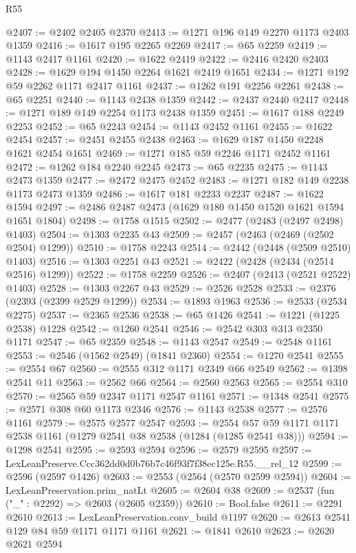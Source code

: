 \begin{lexlean}{R55}
\begin{coremodule}
@2407 := @2402 @2405 @2370
@2413 := @1271 @196 @149 @2270 @1173 @2403 @1359
@2416 := @1617 @195 @2265 @2269
@2417 := @65 @2259
@2419 := @1143 @2417 @1161
@2420 := @1622 @2419
@2422 := @2416 @2420 @2403
@2428 := @1629 @194 @1450 @2264 @1621 @2419 @1651
@2434 := @1271 @192 @59 @2262 @1171 @2417 @1161
@2437 := @1262 @191 @2256 @2261
@2438 := @65 @2251
@2440 := @1143 @2438 @1359
@2442 := @2437 @2440 @2417
@2448 := @1271 @189 @149 @2254 @1173 @2438 @1359
@2451 := @1617 @188 @2249 @2253
@2452 := @65 @2243
@2454 := @1143 @2452 @1161
@2455 := @1622 @2454
@2457 := @2451 @2455 @2438
@2463 := @1629 @187 @1450 @2248 @1621 @2454 @1651
@2469 := @1271 @185 @59 @2246 @1171 @2452 @1161
@2472 := @1262 @184 @2240 @2245
@2473 := @65 @2235
@2475 := @1143 @2473 @1359
@2477 := @2472 @2475 @2452
@2483 := @1271 @182 @149 @2238 @1173 @2473 @1359
@2486 := @1617 @181 @2233 @2237
@2487 := @1622 @1594
@2497 := @2486 @2487 @2473 (@1629 @180 @1450 @1520 @1621 @1594 @1651 @1804)
@2498 := @1758 @1515
@2502 := @2477 (@2483 (@2497 @2498) @1403)
@2504 := @1303 @2235 @43
@2509 := @2457 (@2463 (@2469 (@2502 @2504) @1299))
@2510 := @1758 @2243
@2514 := @2442 (@2448 (@2509 @2510) @1403)
@2516 := @1303 @2251 @43
@2521 := @2422 (@2428 (@2434 (@2514 @2516) @1299))
@2522 := @1758 @2259
@2526 := @2407 (@2413 (@2521 @2522) @1403)
@2528 := @1303 @2267 @43
@2529 := @2526 @2528
@2533 := @2376 (@2393 (@2399 @2529 @1299))
@2534 := @1893 @1963
@2536 := @2533 (@2534 @2275)
@2537 := @2365 @2536
@2538 := @65 @1426
@2541 := @1221 (@1225 @2538) @1228
@2542 := @1260 @2541
@2546 := @2542 @303 @313 @2350 @1171
@2547 := @65 @2359
@2548 := @1143 @2547
@2549 := @2548 @1161
@2553 := @2546 (@1562 @2549) (@1841 @2360)
@2554 := @1270 @2541
@2555 := @2554 @67
@2560 := @2555 @312 @1171 @2349 @66 @2549
@2562 := @1398 @2541 @11
@2563 := @2562 @66
@2564 := @2560 @2563
@2565 := @2554 @310
@2570 := @2565 @59 @2347 @1171 @2547 @1161
@2571 := @1348 @2541
@2575 := @2571 @308 @60 @1173 @2346
@2576 := @1143 @2538
@2577 := @2576 @1161
@2579 := @2575 @2577 @2547
@2593 := @2554 @57 @59 @1171 @1171 @2538 @1161 (@1279 @2541 @38 @2538 (@1284 (@1285 @2541 @38)))
@2594 := @1298 @2541
@2595 := @2593 @2594
@2596 := @2579 @2595
@2597 := LexLeanPreserve.Ccc362dd0d0b76b7c46f93f7f38ec125e.R55.__rel_12
@2599 := @2596 (@2597 @1426)
@2603 := @2553 (@2564 (@2570 @2599 @2594))
@2604 := LexLeanPreservation.prim_natLt
@2605 := @2604 @38
@2609 := @2537 (fun ("_" : @2292) => @2603 (@2605 @2359))
@2610 := Bool.false
@2611 := @2291 @2610
@2613 := LexLeanPreservation.conv_build @1197
@2620 := @2613 @2541 @129 @84 @59 @1171 @1171 @1161
@2621 := @1841 @2610
@2623 := @2620 @2621 @2594

\end{coremodule}
\end{lexlean}
